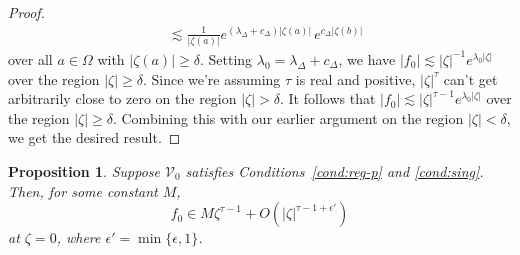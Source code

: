 \documentclass{article}
\theoremstyle{definition}
\theoremstyle{plain}
\newtheorem{prop}{Proposition}
\newcommand{\hardpart}{\mathcal{V}_0}
\newcommand{\solproto}{f_0}
\newcommand{\domain}{\Omega}
\begin{document}
\begin{proof}
\begin{align*}
& \lesssim \frac{1}{|\zeta(a)|} e^{(\lambda_\Delta + c_\Delta)|\zeta(a)|}\,e^{c_\Delta|\zeta(b)|}
\end{align*}
over all $a \in \domain$ with $|\zeta(a)| \ge \delta$. Setting $\lambda_0 = \lambda_\Delta + c_\Delta$, we have $|\solproto| \lesssim |\zeta|^{-1} e^{\lambda_0|\zeta|}$ over the region $|\zeta| \ge \delta$. Since we're assuming $\tau$ is real and positive, $|\zeta|^\tau$ can't get arbitrarily close to zero on the region $|\zeta| > \delta$. It follows that $|\solproto| \lesssim |\zeta|^{\tau-1} e^{\lambda_0|\zeta|}$ over the region $|\zeta| \ge \delta$. Combining this with our earlier argument on the region $|\zeta| < \delta$, we get the desired result.
\end{proof}
\begin{prop}\label{prop:better-proto-estimate}
Suppose $\hardpart$ satisfies {\em Conditions~\eqref{cond:reg-p}} and \eqref{cond:sing}. Then, for some constant $M$,
\[ \solproto \in M\zeta^{\tau-1} + O(|\zeta|^{\tau-1+\epsilon'}) \]
at $\zeta = 0$, where $\epsilon'=\min\{\epsilon, 1\}$.
\end{prop}
\end{document}
